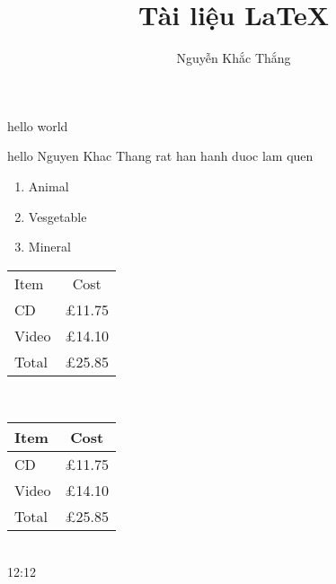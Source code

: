\documentclass[12pt,a4paper]{article}
\begin{document}
\author{Nguyễn Khắc Thắng}
\title{Tài liệu \LaTeX}
\maketitle
\tableofcontents
\pagestyle{plain}
\begin{flushright}
hello world
\end{flushright}
hello Nguyen Khac Thang \linebreak rat han hanh duoc lam quen \linebreak
\begin{enumerate}
\item Animal
\item	Vesgetable
\item	Mineral
\end{enumerate}
\begin{tabular}{lc}
Item & Cost\\
CD & \pounds 11.75\\
Video & \pounds 14.10\\
Total & \pounds 25.85
\end{tabular}\\
\begin{tabular}{|l|c|}
\hline
Item & Cost\\
\hline\hline
CD & \pounds 11.75\\
Video & \pounds 14.10\\
\hline
Total & \pounds 25.85\\
\hline
\end{tabular}\\
\newcommand{\timeofday}[2]{#1:#2}
\timeofday{12}{12}
\end{document}
